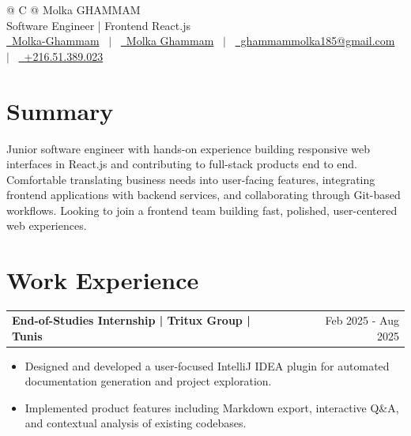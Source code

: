 \documentclass[a4paper,11pt]{article}
\makeatletter
\newenvironment{jobshort}[2]
    {
    \begin{tabularx}{\linewidth}{@{}l X r@{}}
    \textbf{#1} & \hfill &  #2 \\[2.75pt]
    \end{tabularx}
    \begin{minipage}[t]{\linewidth}
    \begin{itemize}[nosep,after=\strut, leftmargin=1em, itemsep=2pt]
    }
    {
    \end{itemize}
    \end{minipage}
    }
\makeatother
\begin{document}
\pagestyle{empty}

\begin{tabularx}{\linewidth}{@{} C @{}}
\Huge{Molka GHAMMAM} \\[3pt]
{\large Software Engineer | Frontend React.js} \\[5pt]
\vspace{2pt}
\href{https://github.com/molkw}{\raisebox{-0.05\height}\faGithub\ Molka-Ghammam} \ $|$ \
\href{https://www.linkedin.com/in/molka-ghammam-560015226}{\raisebox{-0.05\height}\faLinkedin\ Molka Ghammam} \ $|$ \
\href{mailto:ghammammolka185@gmail.com}{\raisebox{-0.05\height}\faEnvelope\ ghammammolka185@gmail.com} \ $|$ \
\href{tel:+216.51.389.023}{\raisebox{-0.05\height}\faMobile\ +216.51.389.023} \\
\end{tabularx}

\vspace{12pt}
\section{Summary}
Junior software engineer with hands-on experience building responsive web interfaces in React.js and contributing to full-stack products end to end. Comfortable translating business needs into user-facing features, integrating frontend applications with backend services, and collaborating through Git-based workflows. Looking to join a frontend team building fast, polished, user-centered web experiences.

\section{Work Experience}

\begin{jobshort}{End-of-Studies Internship | Tritux Group | Tunis}{Feb 2025 - Aug 2025}
\item Designed and developed a user-focused IntelliJ IDEA plugin for automated documentation generation and project exploration.
\item Implemented product features including Markdown export, interactive Q\&A, and contextual analysis of existing codebases.
\end{jobshort}
\end{document}
